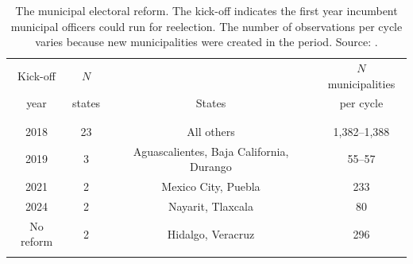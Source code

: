 \documentclass[letter,12pt]{article}
\begin{document}
\begin{table}
  \centering
  \begin{tabular}{cccc}
    Kick-off        &   $N$      &                                           & $N$ municipalities \\ [-0.4ex]
    year            &  states    &  States                                   & per cycle  \\ \\ [-1.8ex] \hline \\ [-1.8ex]
    2018            &          23 & All others                               & 1,382--1,388 \\
    2019            &           3 & Aguascalientes, Baja California, Durango &     55--57 \\
    2021            &           2 & Mexico City, Puebla                      &        233 \\
    2024            &           2 & Nayarit, Tlaxcala                        &         80 \\
    No reform       &           2 & Hidalgo, Veracruz                        &        296 \\ \\ [-1.8ex] \hline
  \end{tabular}
  \caption{The municipal electoral reform. The kick-off indicates the first year incumbent municipal officers could run for reelection. The number of observations per cycle varies because new municipalities were created in the period. Source: \citet{magar.el.dataset.2026}.}\label{T:reel}
\end{table}
\end{document}
